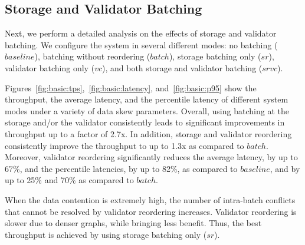 \subsection{Storage and Validator Batching}
\label{subsec:experiment:batching}

Next, we perform a detailed analysis on the effects of storage and validator batching. We configure the system in several different modes: no batching ($baseline$), batching without reordering ($batch$), storage batching only ($sr$), validator batching only
($vc$), and both storage and validator batching ($srvc$).




Figures~\ref{fig:basic:tps},~\ref{fig:basic:latency}, and~\ref{fig:basic:p95} show the throughput, the average latency, and the percentile latency of different system modes under a variety of data skew parameters. Overall, using batching at the storage and/or the validator consistently leads to significant improvements in throughput up to a factor of 2.7x. In addition, storage and validator reordering consistently improve the throughput to up to 1.3x as compared to $batch$. Moreover, validator reordering significantly reduces the average latency, by up to 67\%, and the percentile latencies, by up to 82\%, as compared to $baseline$, and by up to 25\% and 70\% as compared to $batch$.


When the data contention is extremely high, the number of intra-batch conflicts
that cannot be resolved by validator reordering increases. Validator reordering
is slower due to denser graphs, while bringing less benefit. Thus, the best throughput is achieved by using storage batching only ($sr$). 

